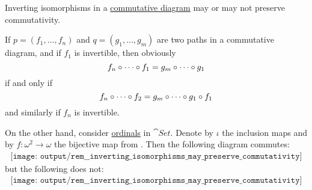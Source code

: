 \begin{remark}\label{rem:inverting_isomorphisms_may_preserve_commutativity}
  Inverting isomorphisms in a \hyperref[def:categorical_diagram]{commutative diagram} may or may not preserve commutativity.

  If \( p = (f_1, \ldots, f_n) \) and \( q = (g_1, \ldots, g_m) \) are two paths in a commutative diagram, and if \( f_1 \) is invertible, then obviously
  \begin{equation*}
    f_n \bincirc \cdots \bincirc f_1 = g_m \bincirc \cdots \bincirc g_1
  \end{equation*}
  if and only if
  \begin{equation*}
    f_n \bincirc \cdots \bincirc f_2 = g_m \bincirc \cdots \bincirc g_1 \bincirc f_1
  \end{equation*}
  and similarly if \( f_n \) is invertible.

  On the other hand, consider \hyperref[def:ordinal]{ordinals} in \( \cat{Set} \). Denote by \( \iota \) the inclusion maps and by \( f: \omega^2 \to \omega \) the bijective map from . Then the following diagram commutes:
  \begin{equation}\label{eq:rem:inverting_isomorphisms_may_preserve_commutativity/ordinals_commuting}
    \begin{aligned}
      \texttt{[image: output/rem\_\_inverting\_isomorphisms\_may\_preserve\_commutativity]}
    \end{aligned}
  \end{equation}
  but the following does not:
  \begin{equation}\label{eq:rem:inverting_isomorphisms_may_preserve_commutativity/ordinals_not_commuting}
    \begin{aligned}
      \texttt{[image: output/rem\_\_inverting\_isomorphisms\_may\_preserve\_commutativity]}
    \end{aligned}
  \end{equation}
\end{remark}

